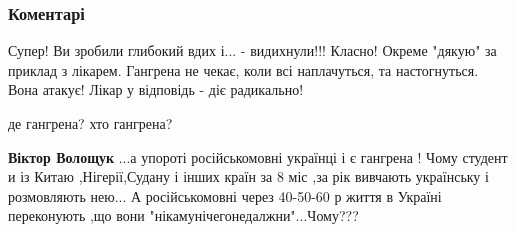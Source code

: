  
 
 
 
 
\subsubsection{Коментарі}

\begin{itemize}
 
\obeycr
Супер!
Ви зробили глибокий вдих і... -
видихнули!!!
Класно!
Окреме "дякую" за приклад з лікарем.
Гангрена не чекає, коли всі наплачуться, та настогнуться.
Вона атакує! Лікар у відповідь - діє радикально!
\restorecr

\begin{itemize}
 
де гангрена? хто гангрена?

\begin{itemize}

 
\textbf{Віктор Волощук} ...а упороті російськомовні українці і є гангрена !
Чому студент и із Китаю ,Нігерії,Судану і інших країн за 8 міс ,за рік вивчають
українську і розмовляють нею... А російськомовні через 40-50-60 р життя в
Україні переконують ,що вони "нікамунічегонедалжни"...Чому???

 

\end{itemize}
\end{itemize}
\end{itemize}
